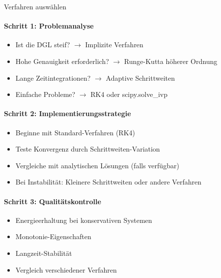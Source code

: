 \begin{KR}{Verfahren auswählen}\\
\paragraph{Schritt 1: Problemanalyse}
\begin{itemize}
    \item Ist die DGL steif? $\rightarrow$ Implizite Verfahren
    \item Hohe Genauigkeit erforderlich? $\rightarrow$ Runge-Kutta höherer Ordnung
    \item Lange Zeitintegrationen? $\rightarrow$ Adaptive Schrittweiten
    \item Einfache Probleme? $\rightarrow$ RK4 oder scipy.solve\_ivp
\end{itemize}

\paragraph{Schritt 2: Implementierungsstrategie}
\begin{itemize}
    \item Beginne mit Standard-Verfahren (RK4)
    \item Teste Konvergenz durch Schrittweiten-Variation
    \item Vergleiche mit analytischen Lösungen (falls verfügbar)
    \item Bei Instabilität: Kleinere Schrittweiten oder andere Verfahren
\end{itemize}

\paragraph{Schritt 3: Qualitätskontrolle}
\begin{itemize}
    \item Energieerhaltung bei konservativen Systemen
    \item Monotonie-Eigenschaften
    \item Langzeit-Stabilität
    \item Vergleich verschiedener Verfahren
\end{itemize}
\end{KR}

